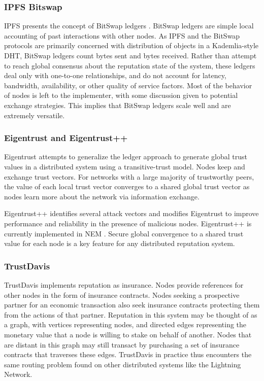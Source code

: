 \documentclass[a4paper,10pt]{article}
\begin{document}
\subsubsection{IPFS Bitswap}
IPFS presents the concept of BitSwap ledgers \cite{18}. BitSwap ledgers are simple local accounting of past interactions with other nodes. As IPFS and the BitSwap protocols are primarily concerned with distribution of objects in a Kademlia-style DHT, BitSwap ledgers count bytes sent and bytes received. Rather than attempt to reach global consensus about the reputation state of the system, these ledgers deal only with one-to-one relationships, and do not account for latency, bandwidth, availability, or other quality of service factors. Most of the behavior of nodes is left to the implementer, with some discussion given to potential exchange strategies. This implies that BitSwap ledgers scale well and are extremely versatile.

\subsubsection{Eigentrust and Eigentrust++}
Eigentrust \cite{19} attempts to generalize the ledger approach to generate global trust values in a distributed system using a transitive-trust model. Nodes keep and exchange trust vectors. For networks with a large majority of trustworthy peers, the value of each local trust vector converges to a shared global trust vector as nodes learn more about the network via information exchange.

Eigentrust++ \cite{20} identifies several attack vectors and modifies Eigentrust to improve performance and reliability in the presence of malicious nodes. Eigentrust++ is currently implemented in NEM \cite{21}.  Secure global convergence to a shared trust value for each node is a key feature for any distributed reputation system.

\subsubsection{TrustDavis}
TrustDavis \cite{22} implements reputation as insurance. Nodes provide references for other nodes in the form of insurance contracts. Nodes seeking a prospective partner for an economic transaction also seek insurance contracts protecting them from the actions of that partner. Reputation in this system may be thought of as a graph, with vertices representing nodes, and directed edges representing the monetary value that a node is willing to stake on behalf of another. Nodes that are distant in this graph may still transact by purchasing a set of insurance contracts that traverses these edges. TrustDavis in practice thus encounters the same routing problem found on other distributed systems like the Lightning Network.
\end{document}
